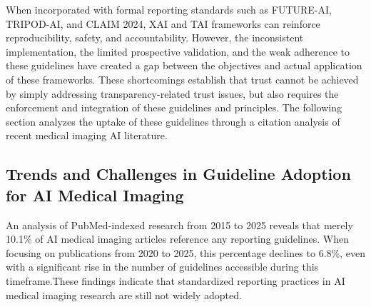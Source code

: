 \documentclass{article}
\begin{document}
When incorporated with formal reporting standards such as FUTURE-AI, TRIPOD-AI, and CLAIM 2024, XAI and TAI frameworks can reinforce reproducibility, safety, and accountability. However, the inconsistent implementation, the limited prospective validation, and the weak adherence to these guidelines have created a gap between the objectives and actual application of these frameworks. These shortcomings establish that trust cannot be achieved by simply addressing transparency-related trust issues, but also requires the enforcement and integration of these guidelines and principles. The following section analyzes the uptake of these guidelines through a citation analysis of recent medical imaging AI literature.

\subsection{Trends and Challenges in Guideline Adoption for AI Medical Imaging}

An analysis of PubMed-indexed research from 2015 to 2025 reveals that merely 10.1\% of AI medical imaging articles reference any reporting guidelines. When focusing on publications from 2020 to 2025, this percentage declines to 6.8\%, even with a significant rise in the number of guidelines accessible during this timeframe.These findings indicate that standardized reporting practices in AI medical imaging research are still not widely adopted.
\end{document}
